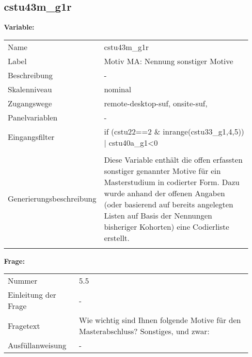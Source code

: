 	
	
	\subsection{cstu43m\_g1r}
	\label{subSection:cstu43m_g1r}

	\noindent\textbf{Variable:}\\
		\begin{tabular}{lL{11.3cm}}
			\label{tableVariable:cstu43m_g1r}
			Name & cstu43m\_g1r \\
			Label & Motiv MA: Nennung sonstiger Motive \\
			Beschreibung & - \\
			Skalenniveau & nominal \\
			Zugangswege &
				remote-desktop-suf,
				onsite-suf,
 \\
			Panelvariablen & -
			 \\
			Eingangsfilter & if (cstu22==2 \& inrange(cstu33\_g1,4,5)) | cstu40a\_g1\textless{}0 \\
 \\
					Generierungsbeschreibung & Diese Variable enthält die offen erfassten sonstiger genannter Motive für ein Masterstudium in codierter Form. Dazu wurde anhand der offenen Angaben (oder basierend auf bereits angelegten Listen auf Basis der Nennungen bisheriger Kohorten) eine Codierliste erstellt.
				 \\	
			 \\
		\end{tabular}

		\vspace*{1 cm}
		\noindent\textbf{Frage:}\\
		\begin{tabular}{lL{11.3cm}}
			\label{tableQuestion:cstu43m_g1r}
			Nummer & 5.5 \\
			Einleitung der Frage & - \\
			Fragetext & Wie wichtig sind Ihnen folgende Motive für den Masterabschluss?
Sonstiges, und zwar: \\
			Ausfüllanweisung & - \\
		\end{tabular}





